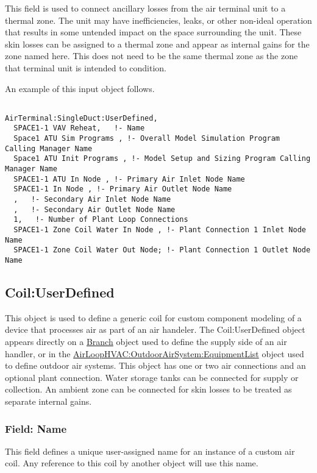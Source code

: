 This field is used to connect ancillary losses from the air terminal unit to a thermal zone. The unit may have inefficiencies, leaks, or other non-ideal operation that results in some untended impact on the space surrounding the unit. These skin losses can be assigned to a thermal zone and appear as internal gains for the zone named here. This does not need to be the same thermal zone as the zone that terminal unit is intended to condition.

An example of this input object follows.

\begin{lstlisting}

AirTerminal:SingleDuct:UserDefined,
  SPACE1-1 VAV Reheat,   !- Name
  Space1 ATU Sim Programs , !- Overall Model Simulation Program Calling Manager Name
  Space1 ATU Init Programs , !- Model Setup and Sizing Program Calling Manager Name
  SPACE1-1 ATU In Node , !- Primary Air Inlet Node Name
  SPACE1-1 In Node , !- Primary Air Outlet Node Name
  ,   !- Secondary Air Inlet Node Name
  ,   !- Secondary Air Outlet Node Name
  1,   !- Number of Plant Loop Connections
  SPACE1-1 Zone Coil Water In Node , !- Plant Connection 1 Inlet Node Name
  SPACE1-1 Zone Coil Water Out Node; !- Plant Connection 1 Outlet Node Name
\end{lstlisting}

\subsection{Coil:UserDefined}\label{coiluserdefined}

This object is used to define a generic coil for custom component modeling of a device that processes air as part of an air handeler. The Coil:UserDefined object appears directly on a \hyperref[branch]{Branch} object used to define the supply side of an air handler, or in the \hyperref[airloophvacoutdoorairsystemequipmentlist]{AirLoopHVAC:OutdoorAirSystem:EquipmentList} object used to define outdoor air systems. This object has one or two air connections and an optional plant connection. Water storage tanks can be connected for supply or collection. An ambient zone can be connected for skin losses to be treated as separate internal gains.

\subsubsection{Field: Name}\label{field-name-2-041}

This field defines a unique user-assigned name for an instance of a custom air coil. Any reference to this coil by another object will use this name.

